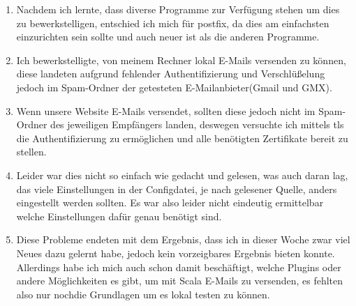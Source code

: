 \begin{enumerate}[label={\Roman*)}]
\begin{enumerate}[label={\arabic*}]
		\item Nachdem ich lernte, dass diverse Programme zur Verf\"ugung stehen um dies zu bewerkstelligen, entschied ich
mich f\"ur postfix, da dies am einfachsten einzurichten sein sollte und auch neuer ist als die anderen Programme.
		\item Ich bewerkstelligte, von meinem Rechner lokal E-Mails versenden zu k\"onnen, diese landeten aufgrund
fehlender Authentifizierung und Verschl\"u\ss{}elung jedoch im Spam-Ordner der getesteten E-Mailanbieter(Gmail und GMX).
		\item Wenn unsere Website E-Mails versendet, sollten diese jedoch nicht im Spam-Ordner des jeweiligen
Empf\"angers landen, deswegen versuchte ich mittels tls die Authentifizierung zu erm\"oglichen und alle ben\"otigten Zertifikate
bereit zu stellen.
		\item Leider war dies nicht so einfach wie gedacht und gelesen, was auch daran lag, das viele Einstellungen in
der Configdatei, je nach gelesener Quelle, anders eingestellt werden sollten. Es war also leider nicht eindeutig ermittelbar
welche Einstellungen daf\"ur genau ben\"otigt sind.
		\item Diese Probleme endeten mit dem Ergebnis, dass ich in dieser Woche zwar viel Neues dazu gelernt habe, jedoch
kein vorzeigbares Ergebnis bieten konnte. Allerdings habe ich mich auch schon damit besch\"aftigt, welche Plugins oder andere
M\"oglichkeiten es gibt, um mit Scala E-Mails zu versenden, es fehlten also \glqq nur noch\glqq die Grundlagen um es lokal testen
zu k\"onnen.
	\end{enumerate}
\end{enumerate}